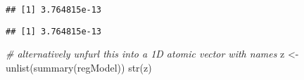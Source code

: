 \documentclass[
]{article}
\newenvironment{Shaded}{\begin{snugshade}}{\end{snugshade}}
\newcommand{\CommentTok}[1]{\textcolor[rgb]{0.56,0.35,0.01}{\textit{#1}}}
\newcommand{\DecValTok}[1]{\textcolor[rgb]{0.00,0.00,0.81}{#1}}
\newcommand{\FunctionTok}[1]{\textcolor[rgb]{0.00,0.00,0.00}{#1}}
\newcommand{\NormalTok}[1]{#1}
\newcommand{\OtherTok}[1]{\textcolor[rgb]{0.56,0.35,0.01}{#1}}
\newcommand{\SpecialCharTok}[1]{\textcolor[rgb]{0.00,0.00,0.00}{#1}}
\newcommand{\StringTok}[1]{\textcolor[rgb]{0.31,0.60,0.02}{#1}}
\begin{document}
\begin{Shaded}
\end{Shaded}

\begin{verbatim}
## [1] 3.764815e-13
\end{verbatim}

\begin{Shaded}
\end{Shaded}

\begin{verbatim}
## [1] 3.764815e-13
\end{verbatim}

\begin{Shaded}
\begin{Highlighting}[]
\CommentTok{\# alternatively unfurl this into a 1D atomic vector with names}
\NormalTok{z }\OtherTok{\textless{}{-}} \FunctionTok{unlist}\NormalTok{(}\FunctionTok{summary}\NormalTok{(regModel))}
\FunctionTok{str}\NormalTok{(z)}
\end{Highlighting}
\end{Shaded}
\end{document}
